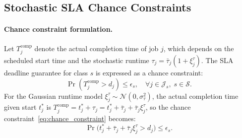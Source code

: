 \documentclass[a4paper,fleqn]{cas-dc}
\begin{document}
\subsection{Stochastic SLA Chance Constraints}
\label{sec:chance_constraints}

\paragraph{Chance constraint formulation.}
Let $T^{\mathrm{comp}}_j$ denote the actual completion time of job $j$, which depends on the scheduled start time and the stochastic runtime $\tau_j = \bar{\tau}_j(1 + \xi^\tau_j)$. The SLA deadline guarantee for class $s$ is expressed as a chance constraint:
\begin{equation}
\label{eq:chance_constraint}
\Pr\!\left(T^{\mathrm{comp}}_j > d_j\right) \leq \epsilon_s, \quad \forall j \in \mathcal{J}_s,\; s \in \mathcal{S}.
\end{equation}
For the Gaussian runtime model $\xi^\tau_j \sim \mathcal{N}(0, \sigma^2_\tau)$, the actual completion time given start $t^*_j$ is $T^{\mathrm{comp}}_j = t^*_j + \tau_j = t^*_j + \bar{\tau}_j + \bar{\tau}_j \xi^\tau_j$, so the chance constraint~\eqref{eq:chance_constraint} becomes:
\begin{equation}
\Pr\!\bigl(t^*_j + \bar{\tau}_j + \bar{\tau}_j \xi^\tau_j > d_j\bigr) \leq \epsilon_s.
\end{equation}
\end{document}
